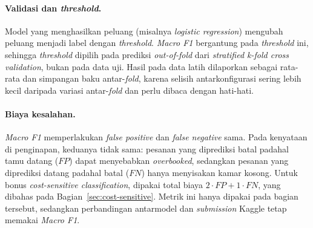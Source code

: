 \paragraph{Validasi dan \textit{threshold}.} Model yang menghasilkan peluang (misalnya \textit{logistic regression}) mengubah peluang menjadi label dengan \textit{threshold}. \textit{Macro F1} bergantung pada \textit{threshold} ini, sehingga \textit{threshold} dipilih pada prediksi \textit{out-of-fold} dari \textit{stratified k-fold cross validation}, bukan pada data uji. Hasil pada data latih dilaporkan sebagai rata-rata dan simpangan baku antar-\textit{fold}, karena selisih antarkonfigurasi sering lebih kecil daripada variasi antar-\textit{fold} dan perlu dibaca dengan hati-hati.

\paragraph{Biaya kesalahan.} \textit{Macro F1} memperlakukan \textit{false positive} dan \textit{false negative} sama. Pada kenyataan di penginapan, keduanya tidak sama: pesanan yang diprediksi batal padahal tamu datang ($FP$) dapat menyebabkan \textit{overbooked}, sedangkan pesanan yang diprediksi datang padahal batal ($FN$) hanya menyisakan kamar kosong. Untuk bonus \textit{cost-sensitive classification}, dipakai total biaya $2 \cdot FP + 1 \cdot FN$, yang dibahas pada Bagian~\ref{sec:cost-sensitive}. Metrik ini hanya dipakai pada bagian tersebut, sedangkan perbandingan antarmodel dan \textit{submission} Kaggle tetap memakai \textit{Macro F1}.
